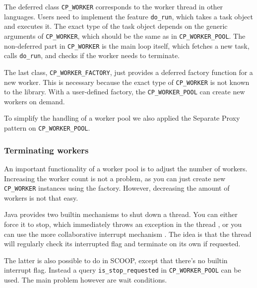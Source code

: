 \documentclass[a4paper,10pt]{report}
\begin{document}
The deferred class \lstinline!CP_WORKER! corresponds to the worker thread in other languages.
Users need to implement the feature \lstinline!do_run!, which takes a task object and executes it.
The exact type of the task object depends on the generic arguments of \lstinline!CP_WORKER!, which should be the same as in \lstinline!CP_WORKER_POOL!.
The non-deferred part in \lstinline!CP_WORKER! is the main loop itself, which fetches a new task, calls \lstinline!do_run!, and checks if the worker needs to terminate.

The last class, \lstinline!CP_WORKER_FACTORY!, just provides a deferred factory function for a new worker.
This is necessary because the exact type of \lstinline!CP_WORKER! is not known to the library.
With a user-defined factory, the \lstinline!CP_WORKER_POOL! can create new workers on demand.

To simplify the handling of a worker pool we also applied the Separate Proxy pattern on \lstinline!CP_WORKER_POOL!.

\subsubsection{Terminating workers}

An important functionality of a worker pool is to adjust the number of workers.
Increasing the worker count is not a problem, as you can just create new \lstinline!CP_WORKER! instances using the factory.
However, decreasing the amount of workers is not that easy.

Java provides two builtin mechanisms to shut down a thread.
You can either force it to stop, which immediately throws an exception in the thread , or you can use the more collaborative interrupt mechanism .
The idea is that the thread will regularly check its interrupted flag and terminate on its own if requested.

The latter is also possible to do in SCOOP, except that there's no builtin interrupt flag.
Instead a query \lstinline!is_stop_requested! in \lstinline!CP_WORKER_POOL! can be used.
The main problem however are wait conditions.
\end{document}
